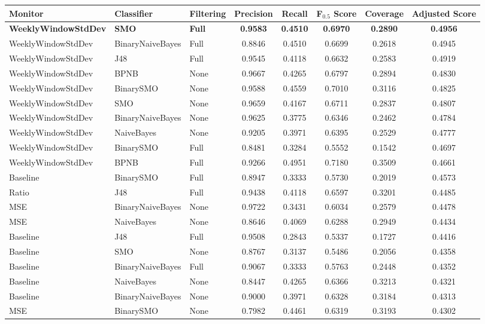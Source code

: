 {
   \footnotesize
   \setlength{\LTleft}{-20cm plus -1fill}
   \setlength{\LTright}{\LTleft}
   \begin{longtable}{|l|l|l|c|c|c|c|c|}
      \hline
         Monitor & Classifier & Filtering & Precision & Recall & F$_{0.5}$ Score & Coverage & Adjusted Score
      \tabularnewline\hline
         \textbf{WeeklyWindowStdDev} & \textbf{SMO} & \textbf{Full} & \textbf{0.9583} & \textbf{0.4510} & \textbf{0.6970} & \textbf{0.2890} & \textbf{0.4956}
      \tabularnewline\hline
         WeeklyWindowStdDev & BinaryNaiveBayes & Full & 0.8846 & 0.4510 & 0.6699 & 0.2618 & 0.4945
      \tabularnewline\hline
         WeeklyWindowStdDev & J48 & Full & 0.9545 & 0.4118 & 0.6632 & 0.2583 & 0.4919
      \tabularnewline\hline
         WeeklyWindowStdDev & BPNB & None & 0.9667 & 0.4265 & 0.6797 & 0.2894 & 0.4830
      \tabularnewline\hline
         WeeklyWindowStdDev & BinarySMO & None & 0.9588 & 0.4559 & 0.7010 & 0.3116 & 0.4825
      \tabularnewline\hline
         WeeklyWindowStdDev & SMO & None & 0.9659 & 0.4167 & 0.6711 & 0.2837 & 0.4807
      \tabularnewline\hline
         WeeklyWindowStdDev & BinaryNaiveBayes & None & 0.9625 & 0.3775 & 0.6346 & 0.2462 & 0.4784
      \tabularnewline\hline
         WeeklyWindowStdDev & NaiveBayes & None & 0.9205 & 0.3971 & 0.6395 & 0.2529 & 0.4777
      \tabularnewline\hline
         WeeklyWindowStdDev & BinarySMO & Full & 0.8481 & 0.3284 & 0.5552 & 0.1542 & 0.4697
      \tabularnewline\hline
         WeeklyWindowStdDev & BPNB & Full & 0.9266 & 0.4951 & 0.7180 & 0.3509 & 0.4661
      \tabularnewline\hline
         Baseline & BinarySMO & Full & 0.8947 & 0.3333 & 0.5730 & 0.2019 & 0.4573
      \tabularnewline\hline
         Ratio & J48 & Full & 0.9438 & 0.4118 & 0.6597 & 0.3201 & 0.4485
      \tabularnewline\hline
         MSE & BinaryNaiveBayes & None & 0.9722 & 0.3431 & 0.6034 & 0.2579 & 0.4478
      \tabularnewline\hline
         MSE & NaiveBayes & None & 0.8646 & 0.4069 & 0.6288 & 0.2949 & 0.4434
      \tabularnewline\hline
         Baseline & J48 & Full & 0.9508 & 0.2843 & 0.5337 & 0.1727 & 0.4416
      \tabularnewline\hline
         Baseline & SMO & None & 0.8767 & 0.3137 & 0.5486 & 0.2056 & 0.4358
      \tabularnewline\hline
         Baseline & BinaryNaiveBayes & Full & 0.9067 & 0.3333 & 0.5763 & 0.2448 & 0.4352
      \tabularnewline\hline
         Baseline & NaiveBayes & None & 0.8447 & 0.4265 & 0.6366 & 0.3213 & 0.4321
      \tabularnewline\hline
         Baseline & BinaryNaiveBayes & None & 0.9000 & 0.3971 & 0.6328 & 0.3184 & 0.4313
      \tabularnewline\hline
         MSE & BinarySMO & None & 0.7982 & 0.4461 & 0.6319 & 0.3193 & 0.4302

\end{longtable}}
